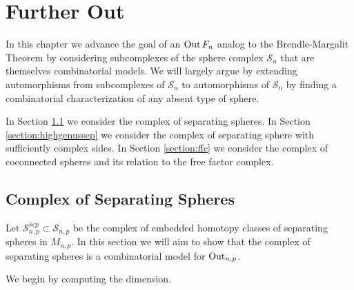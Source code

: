 \chapter{Further Out}
\label{chap:furout}

In this chapter we advance the goal of
an $\operatorname{Out} F_n$ analog to
the
Brendle-Margalit Theorem \cite{meta}
by considering subcomplexes of the
sphere complex $\mathcal S_n$
that are themselves combinatorial models.
We will largely argue by extending automorphisms
from subcomplexes of $\mathcal S_n$ to automorphisms
of $\mathcal S_n$ by finding a combinatorial characterization
of any absent type of sphere.

In Section
\ref{sect:sepspheres} we consider the complex of separating spheres.
In Section
\ref{section:highgenussep}
we consider the complex of separating sphere with sufficiently complex sides.
In Section \ref{section:ffc}
we consider the complex of coconnected spheres and its relation to the free factor complex.


\section{Complex of Separating Spheres}
\label{sect:sepspheres}

Let $\mathcal {S}^{sep}_{n,p} \subset \mathcal {S}_{n,p}$ be the complex of embedded homotopy classes of separating spheres
in $M_{n,p}$. In this section we will aim to show that the complex of separating spheres is a combinatorial model for $\operatorname{Out}_{n,p}$.

\thmsepspheres*

We begin by computing the dimension.


